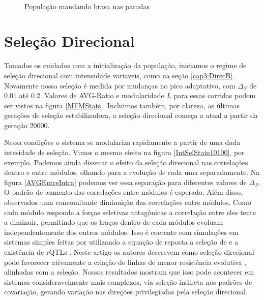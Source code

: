 \begin{center}
\begin{figure}[htbp]
      \\
      \caption{População mandando brasa nas paradas}
      \label{varBurnin}
   \end{figure}
\end{center}

\section{Seleção Direcional}

Tomados os cuidados com a inicialização da população, iniciamos o
regime de seleção direcional com intensidade variaveis, como na seção
\ref{cap3:DirecB}. 
Novamente nossa seleção é medida por mudanças no pico adaptativo, com
$\Delta_S$ de $0.01$ até $0.2$. 
Valores de AVG-Ratio e modularidade $L$ para essas corridas podem ser
vistos na figura \ref{MFMStats}. 
Incluimos também, por clareza, as últimas gerações de seleção
estabilizadora, a seleção direcional começa a atual a partir da geração
20000. 

Nessa condições o sistema se modulariza rapidamente a partir de uma dada
intesidade de seleção. 
Vimos o mesmo efeito na figura \ref{IntSelStats10100}, por exemplo.
Podemos ainda dissecar o efeito da seleção direcional nas correlações
dentro e entre módulos, olhando para a evolução de cada uma
separadamente. 
Na figura \ref{AVGEntreIntra} podemos ver essa separação para diferentes
valores de $\Delta_S$. 
O padrão de aumento das correlações entre módulos é esperado. 
Além disso, observados uma concomitante diminuição das correlações entre
módulos. 
Como cada módulo responde a forças seletivas antagônicas a correlação
entre eles tente a diminuir, permitindo que os traços dentro de cada
módulos evoluam independentemente dos outros módulos. 
Isso é coerente com simulações em sistemas simples feitas por
\cite{Pavlicev2010} utilizando a equação
de reposta a seleção de \cite{Lande1979} e a existência de rQTLs
\citep{Pavlicev2008a}. 
Neste artigo os autores descrevem como seleção direcional pode favorecer
ativamente a criação de linhas de menor resistência evolutiva
\citep[direções do espaço morfológico ricas em
variação, veja][]{Schluter1996},  alinhadas com a seleção. 
Nossos resultados mostram que isso pode acontecer em sistemas
consideravelmente mais complexos, via seleção indireta nos padrões de
covariação, gerando variação nas direções privilegiadas pela seleção
direcional. 

